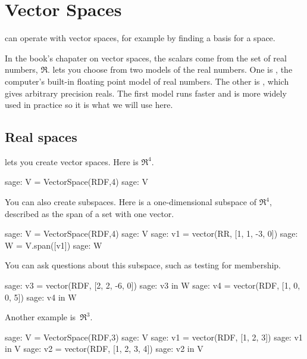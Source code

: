\chapter{Vector Spaces}

\Sage{} can operate with vector spaces, for example by finding a basis for
a space.

In the book's chapater on vector spaces, the scalars come
from the set of real numbers, $\Re$.
\Sage{} lets you choose from two models of the real numbers.
One is , the computer's built-in floating point
model of real numbers.
The other is , which gives arbitrary precision 
reals.
The first model runs faster
and is more widely used in practice so it is what we will use here.
 




\section{Real spaces}

\Sage{} lets you create vector spaces.
Here is $\Re^4$.
\begin{sagecommandline}
sage: V = VectorSpace(RDF,4)
sage: V
\end{sagecommandline}
You can also create subspaces.
Here is a one-dimensional subspace of $\Re^4$, described as the span
of a set with one vector.
\begin{sagecommandline}
sage: V = VectorSpace(RDF,4)
sage: V
sage: v1 = vector(RR, [1, 1, -3, 0])
sage: W = V.span([v1])
sage: W
\end{sagecommandline}

You can ask \Sage{} questions about this subspace, such as 
testing for membership. 
\begin{sagecommandline}
sage: v3 = vector(RDF, [2, 2, -6, 0])
sage: v3 in W
sage: v4 = vector(RDF, [1, 0, 0, 5])
sage: v4 in W
\end{sagecommandline}

Another example is~$\Re^3$.
\begin{sagecommandline}
sage: V = VectorSpace(RDF,3)
sage: V
sage: v1 = vector(RDF, [1, 2, 3])
sage: v1 in V
sage: v2 = vector(RDF, [1, 2, 3, 4])
sage: v2 in V
\end{sagecommandline}

